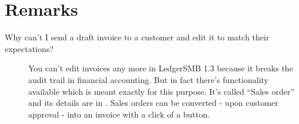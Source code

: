 %
%
%
%
%
%
%
%
%
%
%
%
%


\section{Remarks}
\label{sec-workflows-accounting-remarks}


\begin{description}
\item [Why can't I send a draft invoice to a customer and edit it
   to match their expectations?] 
You can't edit invoices any more in LedgerSMB 1.3 because it breaks the audit trail
in financial accounting. But in fact there's functionality available which is meant
exactly for this purpose. It's called ``Sales order'' and its details are in
. Sales orders can be converted - upon customer approval -
into an invoice with a click of a button.
\end{description}


